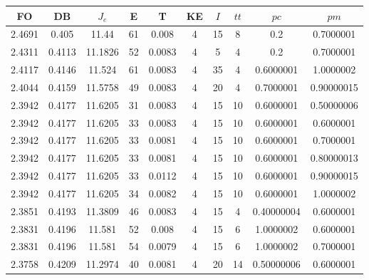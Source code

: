 \begin{table}[h!]
    \footnotesize
    \begin{center}
        \begin{tabular}{|c|c|c|c|c|c|c|c|c|c|}
        \hline
            {\bf FO} & {\bf DB} & $J_e$ & {\bf E} & {\bf T} & {\bf KE} & $I$ & $tt$ & $pc$ & $pm$ \\
        \hline
        \hline
            2.4691 & 0.405  & 11.44 & 61 & 0.008 & 4 & 15 & 8 & 0.2 & 0.7000001\\
        \hline
        \hline
            2.4311 & 0.4113  & 11.1826 & 52 & 0.0083 & 4 & 5 & 4 & 0.2 & 0.7000001\\
        \hline
        \hline
            2.4117 & 0.4146  & 11.524 & 61 & 0.0083 & 4 & 35 & 4 & 0.6000001 & 1.0000002\\
        \hline
        \hline
            2.4044 & 0.4159  & 11.5758 & 49 & 0.0083 & 4 & 20 & 4 & 0.7000001 & 0.90000015\\
        \hline
        \hline
            2.3942 & 0.4177  & 11.6205 & 31 & 0.0083 & 4 & 15 & 10 & 0.6000001 & 0.50000006\\
        \hline
        \hline
            2.3942 & 0.4177  & 11.6205 & 33 & 0.0083 & 4 & 15 & 10 & 0.6000001 & 0.6000001\\
        \hline
        \hline
            2.3942 & 0.4177  & 11.6205 & 33 & 0.0081 & 4 & 15 & 10 & 0.6000001 & 0.7000001\\
        \hline
        \hline
            2.3942 & 0.4177  & 11.6205 & 33 & 0.0081 & 4 & 15 & 10 & 0.6000001 & 0.80000013\\
        \hline
        \hline
            2.3942 & 0.4177  & 11.6205 & 33 & 0.0112 & 4 & 15 & 10 & 0.6000001 & 0.90000015\\
        \hline
        \hline
            2.3942 & 0.4177  & 11.6205 & 34 & 0.0082 & 4 & 15 & 10 & 0.6000001 & 1.0000002\\
        \hline
        \hline
            2.3851 & 0.4193  & 11.3809 & 46 & 0.0083 & 4 & 15 & 4 & 0.40000004 & 0.6000001\\
        \hline
        \hline
            2.3831 & 0.4196  & 11.581 & 52 & 0.008 & 4 & 15 & 6 & 1.0000002 & 0.6000001\\
        \hline
        \hline
            2.3831 & 0.4196  & 11.581 & 54 & 0.0079 & 4 & 15 & 6 & 1.0000002 & 0.7000001\\
        \hline
        \hline
            2.3758 & 0.4209  & 11.2974 & 40 & 0.0081 & 4 & 20 & 14 & 0.50000006 & 0.6000001\\

\end{tabular}
\end{center}
\end{table}
